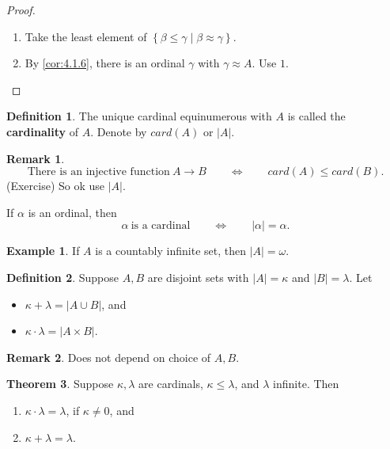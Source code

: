 \documentclass{article}
\newcommand{\rb}[1]{\left( #1 \right)}
\newcommand{\cb}[1]{\left\{ #1 \right\}}
\newcommand{\abs}[1]{\left\lvert #1 \right\rvert}
\theoremstyle{definition}\newtheorem{definition}{Definition}[subsection]
\theoremstyle{definition}\newtheorem{remark1}[definition]{Remark}
\theoremstyle{definition}\newtheorem{example1}[definition]{Example}
\theoremstyle{definition}\newtheorem*{remark2}{Remark}
\theoremstyle{definition}\newtheorem*{example2}{Example}
\theoremstyle{definition}\newtheorem*{note}{Note}
\theoremstyle{definition}\newtheorem*{notation}{Notation}
\newtheorem{theorem}[definition]{Theorem}
\begin{document}
\begin{proof}
\hfill
\begin{enumerate}
\item Take the least element of $ \cb{\beta \le \gamma \mid \beta \approx \gamma} $.
\item By \ref{cor:4.1.6}, there is an ordinal $ \gamma $ with $ \gamma \approx A $. Use $ 1 $.
\end{enumerate}
\end{proof}

\begin{definition}
The unique cardinal equinumerous with $ A $ is called the \textbf{cardinality} of $ A $. Denote by $ card\rb{A} $ or $ \abs{A} $.
\end{definition}

\begin{remark2}
$$ \text{There is an injective function} \ A \to B \qquad \iff \qquad card\rb{A} \le card\rb{B}. $$
(Exercise) So ok use $ \abs{A} $.
\end{remark2}

If $ \alpha $ is an ordinal, then
$$ \alpha \ \text{is a cardinal} \qquad \iff \qquad \abs{\alpha} = \alpha. $$

\begin{example2}
If $ A $ is a countably infinite set, then $ \abs{A} = \omega $.
\end{example2}

\begin{definition}
Suppose $ A, B $ are disjoint sets with $ \abs{A} = \kappa $ and $ \abs{B} = \lambda $. Let
\begin{itemize}
\item $ \kappa + \lambda = \abs{A \cup B} $, and
\item $ \kappa \cdot \lambda = \abs{A \times B} $.
\end{itemize}
\end{definition}

\begin{remark2}
Does not depend on choice of $ A, B $.
\end{remark2}

\begin{theorem}
\label{thm:4.2.5}
Suppose $ \kappa, \lambda $ are cardinals, $ \kappa \le \lambda $, and $ \lambda $ infinite. Then
\begin{enumerate}
\item $ \kappa \cdot \lambda = \lambda $, if $ \kappa \ne 0 $, and
\item $ \kappa + \lambda = \lambda $.
\end{enumerate}
\end{theorem}
\end{document}
